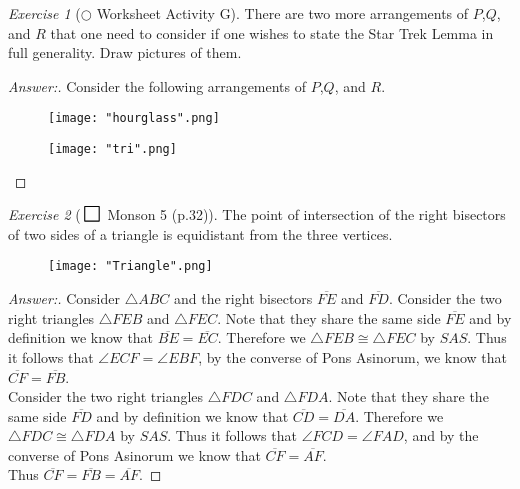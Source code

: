 \documentclass[12pt]{amsart}
\theoremstyle{remark}
\newtheorem*{exercise}{Exercise}%
\theoremstyle{mycomment}
\def\msquare{\mathord{\scalerel*{\Box}{gX}}}
\begin{document}
\begin{exercise}[$\bigcirc$ Worksheet Activity G] There are two more arrangements of $P$,$Q$, and $R$ that one need to consider if one wishes to state the Star Trek Lemma in full generality. Draw pictures of them.
\begin{proof}[Answer:] Consider the following arrangements of $P$,$Q$, and $R$.
\begin{figure}[H]
\caption{}
\centering
\texttt{[image: "hourglass".png]}
\end{figure}
\begin{figure}[H]
\caption{}
\centering
\texttt{[image: "tri".png]}
\end{figure}


\end{proof}
\end{exercise}

\begin{exercise}[$\msquare$ Monson 5 (p.32)] The point of intersection of the right bisectors of two sides of a triangle is equidistant from the three vertices.\\
\begin{figure}[H]
\centering
\texttt{[image: "Triangle".png]}
\end{figure}





\begin{proof}[Answer:] Consider $\triangle ABC$ and the right bisectors $\overline{FE}$ and $\overline{FD}$. Consider the two right triangles $\triangle FEB$ and $\triangle FEC$. Note that they share the same side $\overline{FE}$ and by definition we know that $\overline{BE} = \overline{EC}$. Therefore we $\triangle FEB \cong \triangle FEC$ by $SAS$. Thus it follows that $\angle ECF = \angle EBF$, by the converse of Pons Asinorum, we know that $\overline{CF} = \overline{FB}$. \\

Consider the two right triangles $\triangle FDC$ and $\triangle FDA$. Note that they share the same side $\overline{FD}$ and by definition we know that $\overline{CD} = \overline{DA}$. Therefore we $\triangle FDC \cong \triangle FDA$ by $SAS$. Thus it follows that $\angle FCD = \angle FAD$, and by the converse of Pons Asinorum we know that $\overline{CF} = \overline{AF}$.\\
Thus $\overline{CF} = \overline{FB} = \overline{AF}$. 
\end{proof}
\end{exercise}
\end{document}
